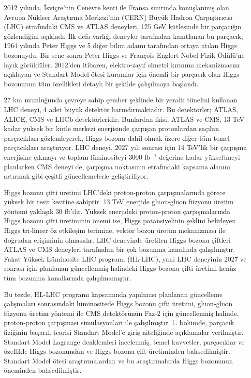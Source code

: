 2012 yılında, İsviçre’nin  Cenevre  kenti  ile  Fransa  sınırında  konuşlanmış olan Avrupa Nükleer Araştırma Merkezi’nin (CERN) Büyük Hadron Çarpıştırıcısı (LHC) etrafındaki CMS  ve  ATLAS  deneyleri, 125 GeV kütlesinde bir parçacığın gözlendiğini açıkladı. İlk defa varlığı deneyler tarafından kanıtlanan bu parçacık, 1964 yılında Peter Higgs ve 5 diğer bilim adamı tarafından ortaya atılan Higgs bozonuydu. Bir sene sonra Peter Higgs ve François Englert Nobel Fizik Ödülü'ne layık görüldüler. 2012'den itibaren, elektro-zayıf simetri kırınımı mekanizmasını açıklayan ve Standart Model ötesi kuramlar için önemli bir parçacık olan Higgs bozonunun tüm özellikleri detaylı bir şekilde çalışılmaya başlandı.

27 km uzunluğunda çevreye sahip çember şeklinde bir yeraltı tünelini kullanan LHC deneyi, 4 adet büyük detektör barındırmaktadır. Bu detektörler; ATLAS, ALICE, CMS ve LHCb detektörleridir. Bunlardan ikisi, ATLAS ve CMS, 13 TeV kadar yüksek bir kütle merkezi enerjisinde çarpışan protonlardan saçılan parçacıkları gözlemleyerek, Higgs bozonu dahil olmak üzere diğer tüm temel parçacıkları araştırıyor. LHC deneyi, 2027 yılı sonrası için 14 TeV'lik bir çarpışma enerjisine çıkmayı ve toplam lüminositeyi 3000 fb$^{-1}$ değerine kadar yükseltmeyi planlarken CMS deneyi de, çarpışma noktasının etrafındaki kapsama alanını artırmak gibi çeşitli güncellemelerle geliştiriliyor.

Higgs bozonu çifti üretimi LHC'deki proton-proton çarpışmalarında görece yüksek bir tesir kesitine sahiptir. 13 TeV enerjide gluon-gluon füzyonu üretim yöntemi yaklaşık 30 fb'dir. Yüksek enerjideki proton-proton çarpışmalarında Higgs bozonu çifti üretiminin önemi ise, Higgs potansiyelinin şeklini belirleyen Higgs tri-lineer öz etkileşim terimine, vektör bozon üretim mekanizması ile doğrudan erişiminin olmasıdır. LHC deneyinde üretilen Higgs bozonu çiftleri ATLAS ve CMS deneyleri tarafından bir çok bozunma kanalında çalışılmıştır. Fakat Yüksek Lüminosite LHC programı (HL-LHC), yani LHC deneyinin 2027 ve sonrası için planlanan güncellenmiş halindeki Higgs bozonu çifti üretimi henüz tüm bozunma kanallarında çalışılmamıştır.

Bu tezde, HL-LHC programı kapsamında yapılması planlanan güncelleme çalışmaları sonrasındaki lüminositede Higgs bozonu çifti üretimi, gluon-gluon füzyonu üretim yöntemi ile CMS detektörünün Faz-2 için güncellenmiş halinde, proton-proton çarpışması simülasyonları ile çalışılmıştır. 1. bölümde, parçacık fiziğinin başarılı teorisi Standart Model'e giriş niteliğinde açıklamalar verilmiştir. Standart Model Lagrange denklemleri incelenmiş, temel kuvvetler, parçacıklar ve özellikle Higgs bozonundan ve Higgs bozonu çift üretiminden bahsedilmiştir. Standart Model ötesi araştırmalardan ve bu araştırmalarda Higgs bozonunun öneminden bahsedilmiştir.

